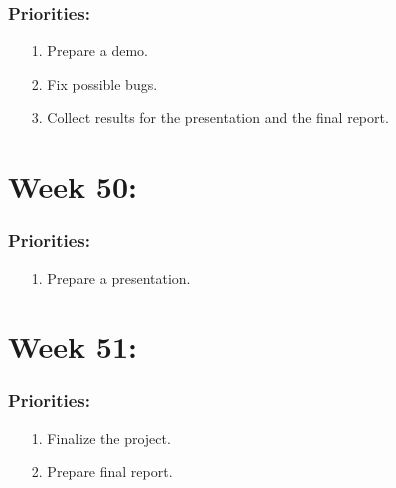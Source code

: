 \documentclass{article}
\begin{document}
\subsubsection*{Priorities:}
\begin{itemize}
\item[1.] Prepare a demo. 
\item[2.] Fix possible bugs. 
\item[3.] Collect results for the presentation and the final report.
\end{itemize}


\section*{Week 50:} 
\subsubsection*{Priorities:}
\begin{itemize}
\item[1.]  Prepare a presentation.
\end{itemize}


\section*{Week 51:} 
\subsubsection*{Priorities:}
\begin{itemize}
\item[1.] Finalize the project.
\item[2.] Prepare final report. 
\end{itemize}


\begin{comment}
Sample table in case it's needed
\begin{center}
	\begin{tabular}{ l | l | l | l | l | l || l | l | l | l || l}
		\textbf{K} & Sampling & C-space & VocabSize & TrainSize & Kernel & Airplanes & Cars & Faces & Motorbikes & MAP \\ 
		\hline
		400 & dense & gray & 100 & 300 & linear & 87 & 74 & 95 & 69 & 81 \\
		800 & dense & gray & 100 & 300 & linear & 93 & 70 & 86 & 73 & 81 \\
		1600 & dense & gray & 100 & 300 & linear & 88 & 72 & 86 & 64 & 78 \\
		2000 & dense & gray & 100 & 300 & linear & 86 & 73 & 81 & 51 & 73 \\	
		4000 & dense & gray & 100 & 300 & linear & 90 & 75 & 83 & 53 & 75 \\	
	\end{tabular}
\end{center}

\end{comment}


\begin{comment}
\begin{itemize}
	\item MatLab (http://www.mathworks.nl/products/matlab/)
	\item VL\_Feat (http://www.vlfeat.org/)
	\item LibSVM (http://www.csie.ntu.edu.tw/cjlin/libsvm/)
	\item Caltech Vision Group (http://www.vision.caltech.edu/)
\end{itemize}
\end{comment}
\end{document}
